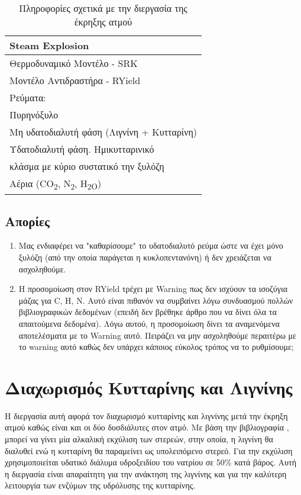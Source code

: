 \documentclass[11pt]{article}
\begin{document}
\begin{table}[htbp]
\caption{Πληροφορίες σχετικά με την διεργασία της έκρηξης ατμού}
\centering
\begin{tabular}{l}
\hline
Steam Explosion\\
\hline
Θερμοδυναμικό Μοντέλο - SRK\\
Μοντέλο Αντιδραστήρα - RYield\\
Ρεύματα:\\
\hline
Πυρηνόξυλο\\
\hline
Μη υδατοδιαλυτή φάση  (Λιγνίνη + Κυτταρίνη)\\
\hline
Υδατοδιαλυτή φάση. Ημικυτταρινικό\\
κλάσμα με κύριο συστατικό την ξυλόζη\\
\hline
Αέρια (CO\textsubscript{2}, N\textsubscript{2}, H\textsubscript{2O})\\
\hline
\end{tabular}
\end{table}

\subsection{Απορίες}
\label{sec:orgb358aa3}
\begin{enumerate}
\item Μας ενδιαφέρει να "καθαρίσουμε" το υδατοδιαλυτό ρεύμα ώστε να έχει μόνο ξυλόζη (από την οποία παράγεται η κυκλοπεντανόνη) ή δεν χρειάζεται να ασχοληθούμε.
\item Η προσομοίωση στον RYield τρέχει με Warning πως δεν ισχύουν τα ισοζύγια μάζας για C, H, N. Αυτό είναι πιθανόν να συμβαίνει λόγω συνδυασμού πολλών βιβλιογραφικών δεδομένων (επειδή δεν βρέθηκε άρθρο που να δίνει όλα τα απαιτούμενα δεδομένα). Λόγω αυτού, η προσομοίωση δίνει τα αναμενόμενα αποτελέσματα με το Warning αυτό. Πειράζει να μην ασχοληθούμε περαιτέρω με το warning αυτό καθώς δεν υπάρχει κάποιος εύκολος τρόπος να το ρυθμίσουμε;
\end{enumerate}

\section{Διαχωρισμός Κυτταρίνης και Λιγνίνης}
\label{sec:org3add0a8}
Η διεργασία αυτή αφορά τον διαχωρισμό κυτταρίνης και λιγνίνης μετά την έκρηξη ατμού καθώς είναι και οι δύο δυσδιάλυτες στον ατμό. Με βάση την βιβλιογραφία \cite{rodriguezOliveStoneAttractive2008}, μπορεί να γίνει μία αλκαλική εκχύλιση των στερεών, στην οποία, η λιγνίνη θα διαλυθεί ενώ η κυτταρίνη θα παραμείνει ως υπολειπόμενο στερεό. Για την εκχύλιση χρησιμοποιείται υδατικό
διάλυμα υδροξειδίου του νατρίου σε 50\% κατά βάρος. Αυτή η διεργασία είναι απαραίτητη για την ανάκτηση της λιγνίνης και για την καλύτερη λειτουργία των ενζύμων της υδρόλυσης της κυτταρίνης.
\end{document}

